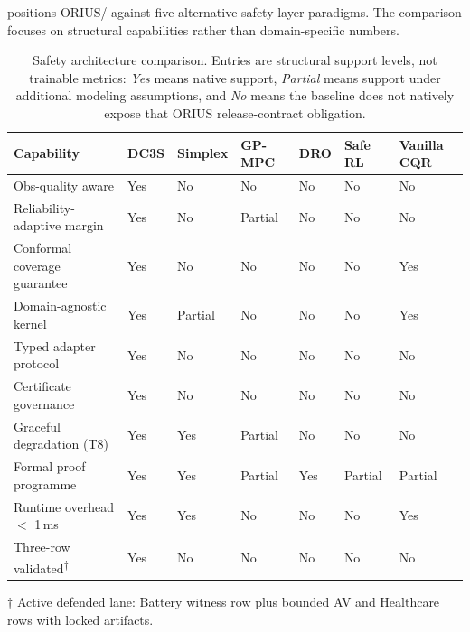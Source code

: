  positions ORIUS/\dcs{} against five alternative
safety-layer paradigms.  The comparison focuses on structural capabilities rather
than domain-specific numbers.

\begin{table}[t]
\caption{Safety architecture comparison. Entries are structural support levels,
not trainable metrics: \emph{Yes} means native support, \emph{Partial} means
support under additional modeling assumptions, and \emph{No} means the baseline
does not natively expose that ORIUS release-contract obligation.}
\label{tab:safety_comparison}
\centering\scriptsize
\setlength{\tabcolsep}{3.2pt}
\renewcommand{\arraystretch}{1.08}
\begin{tabularx}{0.98\textwidth}{p{3.1cm}XXXXXX}
\toprule
\textbf{Capability} & \textbf{DC3S} & \textbf{Simplex} & \textbf{GP-MPC}
  & \textbf{DRO} & \textbf{Safe RL} & \textbf{Vanilla CQR} \\
\midrule
Obs-quality aware & Yes & No & No & No & No & No \\
Reliability-adaptive margin & Yes & No & Partial & No & No & No \\
Conformal coverage guarantee & Yes & No & No & No & No & Yes \\
Domain-agnostic kernel & Yes & Partial & No & No & No & Yes \\
Typed adapter protocol & Yes & No & No & No & No & No \\
Certificate governance & Yes & No & No & No & No & No \\
Graceful degradation (T8) & Yes & Yes & Partial & No & No & No \\
Formal proof programme & Yes & Yes & Partial & Yes & Partial & Partial \\
Runtime overhead $<$ 1\,ms & Yes & Yes & No & No & No & Yes \\
Three-row validated\textsuperscript{$\dagger$} & Yes & No & No & No & No & No \\
\bottomrule
\end{tabularx}
\end{table}

{\footnotesize $\dagger$ Active defended lane: Battery witness row plus bounded AV and Healthcare rows with locked artifacts.}

